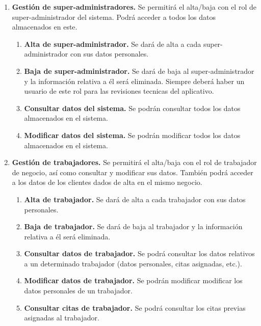 \begin{enumerate}[leftmargin=1.75cm,start=1,label={\bfseries RF-\arabic*.}]
\setlength\itemsep{1em} %
    \item \textbf{Gestión de super-administradores.} Se permitirá el alta/baja con el rol de super-administrador del
    sistema. Podrá acceder a todos los datos almacenados en este.
    \begin{enumerate}[start=1,label={\bfseries RF-1.\arabic*.}]
        \item \textbf{Alta de super-administrador.} Se dará de alta a cada super-administrador con sus datos personales.
        \item \textbf{Baja de super-administrador.} Se dará de baja al super-administrador y la información relativa a
        él será eliminada. Siempre deberá haber un usuario de este rol para las revisiones tecnicas del aplicativo.
        \item \textbf{Consultar datos del sistema.} Se podrán consultar todos los datos almacenados en el sistema.
        \item \textbf{Modificar datos del sistema.} Se podrán modificar todos los datos almacenados en el sistema.
    \end{enumerate}

    \item \textbf{Gestión de trabajadores.} Se permitirá el alta/baja con el rol de trabajador de negocio,
    así como consultar y modificar sus datos. También podrá acceder a los datos de los clientes dados de alta
    en el mismo negocio.
    \begin{enumerate}[start=1,label={\bfseries RF-2.\arabic*.}]
        \item \textbf{Alta de trabajador.} Se dará de alta a cada trabajador con sus datos personales.
        \item \textbf{Baja de trabajador.} Se dará de baja al trabajador y la información relativa a él será eliminada.
        \item \textbf{Consultar datos de trabajador.} Se podrá consultar los datos relativos a un determinado
        trabajador (datos personales, citas asignadas, etc.).
        \item \textbf{Modificar datos de trabajador.} Se podrán modificar modificar los datos personales de un
        trabajador.
        \item \textbf{Consultar citas de trabajador.} Se podrá consultar los citas previas asignadas al trabajador.
    \end{enumerate}


\end{enumerate}
